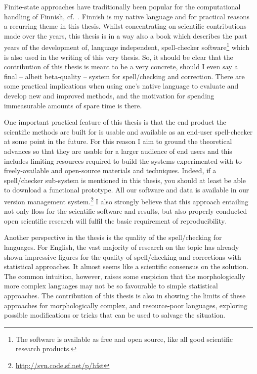 \documentclass[officiallayout,final]{unihelcompling}
\begin{document}
Finite-state approaches have traditionally been popular for the computational
handling of Finnish, cf.~\citet{koskenniemi1983twolevel}. Finnish is my native
language and for practical reasons a recurring theme in this thesis. Whilst
concentrating on scientific contributions made over the years, this thesis is
in a way also a book which describes the past years of the development of,
language independent, \gls{spell-checker} software\footnote{The software is
    available as free and open source, like all good scientific research
products.} which is also used in the writing of this very thesis. So, it should
be clear that the contribution of this thesis is meant to be a very concrete,
should I even say a final -- albeit beta-quality -- system for spell\-/checking
and correction.  There are some practical implications when using one's native
language to evaluate and develop new and improved methods, and the motivation
for spending immeasurable amounts of spare time is there.

One important practical feature of this thesis is that the end product the
scientific methods are built for is usable and available as an end-user
spell-checker at some point in the future. For this reason I aim to ground the
theoretical advances so that they are usable for a larger audience of
end users and this includes limiting resources required to build the systems
experimented with to freely-available and open-source materials and techniques.
Indeed, if a spell\-/checker sub-system is mentioned in this thesis, you
should at least be able to download a functional prototype.  All our software
and data is available in our version management
system.\footnote{\url{http://svn.code.sf.net/p/hfst}} I also strongly believe
that this approach entailing not only \gls{floss} for
the scientific software and results, but also properly conducted open
scientific research will fulfil the basic requirement of reproducibility.

Another perspective in the thesis is the quality of the spell\-/checking for
 languages. For
English, the vast majority of research on the topic has already shown
impressive figures for the quality of spell\-/checking and corrections with
statistical approaches. It almost seems like a scientific consensus on the
solution. The common intuition, however, raises some suspicion that the
morphologically more complex languages may not be so favourable to simple
statistical approaches. The contribution of this thesis is also in showing the
limits of these approaches for morphologically complex, and resource-poor
languages, exploring possible modifications or tricks that can be used to
salvage the situation.
\end{document}
